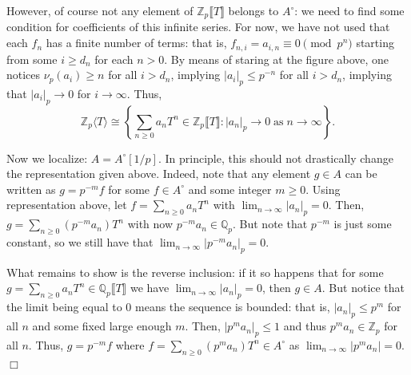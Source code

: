 \documentclass{template}
\newcommand{\qedwhite}{\hfill \ensuremath{\Box}}
\begin{document}
However, of course not any element of $\mathbb{Z}_p\lBrack T \rBrack$ belongs to
$A^{\circ}$: we need to find some condition for coefficients of this infinite
series. For now, we have not used that each $f_n$ has a finite number of terms:
that is, $f_{n,i} = a_{i,n} \equiv 0 \pmod{p^n}$ starting from some $i \geq d_n$
for each $n>0$. By means of staring at the figure above, one notices $\nu_p(a_i)
\geq n$ for all $i>d_n$, implying $|a_i|_p \leq p^{-n}$ for all $i > d_n$,
implying that $|a_i|_p \to 0$ for $i \to \infty$. Thus,
\begin{equation*}
    \mathbb{Z}_p \langle T \rangle \cong \left\{\sum_{n \geq 0}a_nT^n \in \mathbb{Z}_p\lBrack T \rBrack: |a_n|_p \to 0 \; \text{as} \; n \to \infty\right\}.
\end{equation*}

Now we localize: $A = A^{\circ}[1/p]$. In principle, this should not drastically
change the representation given above. Indeed, note that any element $g \in A$
can be written as $g = p^{-m}f$ for some $f \in A^{\circ}$ and some integer $m
\geq 0$. Using representation above, let $f = \sum_{n \geq 0}a_nT^n$ with
$\lim_{n \to \infty}|a_n|_p = 0$. Then, $g=\sum_{n \geq 0}(p^{-m}a_n)T^n$ with
now $p^{-m}a_n \in \mathbb{Q}_p$. But note that $p^{-m}$ is just some constant,
so we still have that $\lim_{n \to \infty}|p^{-m}a_n|_p = 0$.

What remains to show is the reverse inclusion: if it so happens that for some
$g=\sum_{n \geq 0}a_nT^n \in \mathbb{Q}_p\lBrack T \rBrack$ we have $\lim_{n \to
\infty}|a_n|_p=0$, then $g \in A$. But notice that the limit being equal to $0$
means the sequence is bounded: that is, $|a_n|_p \leq p^{m}$ for all $n$ and
some fixed large enough $m$. Then, $|p^ma_n|_p \leq 1$ and thus $p^ma_n \in
\mathbb{Z}_p$ for all $n$. Thus, $g = p^{-m}f$ where $f = \sum_{n \geq
0}(p^ma_n)T^n \in A^{\circ}$ as $\lim_{n \to \infty}|p^ma_n|=0$. \qedwhite
\end{document}
